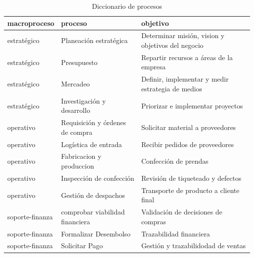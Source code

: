 \documentclass[11pt]{article}
\begin{document}
\begin{longtable}[c]{  | m{2.5cm} | m{2.5cm}| m{4cm} |}

  \caption{Diccionario de procesos}
  
  \label{table:diccionario_procesos}
  
   
    \hline
  macroproceso   &               proceso                             &                objetivo        \\
  \hline
  estratégico   &               Planeación estratégica            &    Determinar misión, vision y objetivos del negocio                               \\
  estratégico   &               Presupuesto                         &  Repartir recursos a áreas de la empresa                                \\
  estratégico   &               Mercadeo                            &  Definir, implementar y medir estrategia de medios                                 \\
  estratégico   &               Investigación y desarrollo         &  Priorizar e implementar proyectos                                 \\
  operativo      &               Requisición y órdenes de compra   &  Solicitar material a proveedores                                 \\
  operativo      &               Logística de entrada               & Recibir pedidos de proveedores                                  \\
  operativo      &               Fabricacion y produccion            &  Confección de prendas                                 \\
  operativo      &               Inspección de confección          &   Revisión de tiqueteado y defectos                                \\
  operativo      &               Gestión de despachos               &  Transporte de producto a cliente final                                 \\
  soporte-finanza&               comprobar viabilidad financiera     &  Validación de decisiones de compras                                 \\
  soporte-finanza&               Formalizar Desembolso               &   Trazabilidad financiera                                \\
  soporte-finanza&               Solicitar Pago                      &  Gestión y trazabilidodad de ventas                                 \\

\end{longtable}
\end{document}
